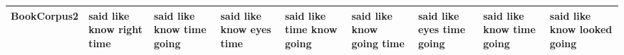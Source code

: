 \documentclass[11pt,a4paper]{article}
\begin{document}
\begin{appendices}
\begin{table*}[htb]
\begin{tiny}
\begin{tabular}{|p{}|p{}|p{}|p{}|p{}|p{}|p{}|p{}|p{}|}
    BookCorpus2 & said \newline like \newline know \newline right \newline time & said \newline like \newline know \newline time \newline going & said \newline like \newline know \newline eyes \newline time & said \newline like \newline time \newline know \newline going & said \newline like \newline know \newline going \newline time & said \newline like \newline eyes \newline time \newline going & said \newline like \newline know \newline time \newline going & said \newline like \newline know \newline looked \newline going\\\hline

\end{tabular}
\end{tiny}
\end{table*}
\end{appendices}
\end{document}
